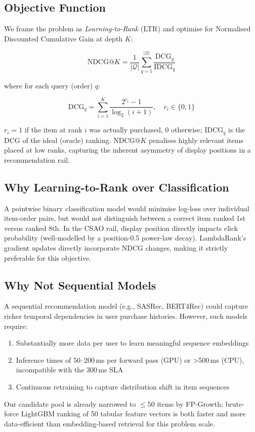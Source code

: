 \documentclass[conference]{IEEEtran}
\begin{document}
\subsection{Objective Function}

We frame the problem as \emph{Learning-to-Rank} (LTR) and optimise for
Normalised Discounted Cumulative Gain at depth $K$:

\begin{equation}
  \text{NDCG}@K = \frac{1}{|\mathcal{Q}|}
  \sum_{q=1}^{|\mathcal{Q}|} \frac{\text{DCG}_q}{\text{IDCG}_q}
\end{equation}

where for each query (order) $q$:

\begin{equation}
  \text{DCG}_q = \sum_{i=1}^{K} \frac{2^{r_i} - 1}{\log_2(i+1)},
  \quad r_i \in \{0,1\}
\end{equation}

$r_i = 1$ if the item at rank $i$ was actually purchased, $0$ otherwise;
$\text{IDCG}_q$ is the DCG of the ideal (oracle) ranking. NDCG@$K$ penalises
highly relevant items placed at low ranks, capturing the inherent asymmetry of
display positions in a recommendation rail.

\subsection{Why Learning-to-Rank over Classification}

A pointwise binary classification model would minimise log-loss over individual
item-order pairs, but would not distinguish between a correct item ranked 1st
versus ranked 8th. In the CSAO rail, display position directly impacts click
probability (well-modelled by a position-0.5 power-law decay). LambdaRank's gradient updates directly
incorporate NDCG changes, making it strictly preferable for this objective.

\subsection{Why Not Sequential Models}

A sequential recommendation model (e.g., SASRec, BERT4Rec) could capture richer temporal dependencies in user
purchase histories. However, such models require:
\begin{enumerate}
  \item Substantially more data per user to learn meaningful sequence embeddings
  \item Inference times of 50--200\,ms per forward pass (GPU) or >500\,ms (CPU),
        incompatible with the 300\,ms SLA
  \item Continuous retraining to capture distribution shift in item sequences
\end{enumerate}
Our candidate pool is already narrowed to $\leq 50$ items by FP-Growth;
brute-force LightGBM ranking of 50 tabular feature vectors is both faster and
more data-efficient than embedding-based retrieval for this problem scale.
\end{document}
